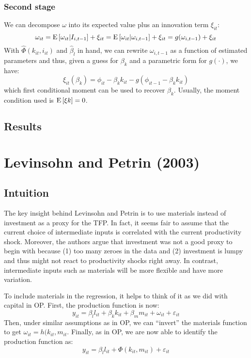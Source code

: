 \subsubsection{Second stage}

We can decompose $\omega$ into its expected value plus an innovation term $\xi_{it}$: $$\omega_{it} = \operatorname{E}\left[\omega_{it}|I_{i,t-1}\right] + \xi_{it} =  \operatorname{E}\left[\omega_{it}|\omega_{i,t-1}\right] + \xi_{it} = g(\omega_{i,t-1}) + \xi_{it} $$ With $\hat\Phi(k_{it}, i_{it})$ and $\hat\beta_l$ in hand, we can rewrite $\omega_{i,t-1}$ as a function of estimated parameters and thus, given a guess for $\beta_k$ and a parametric form for $g(\cdot)$, we have: $$ \xi_{it}(\beta_k) = \phi_{it} - \beta_k k_{it} - g(\phi_{it-1} - \beta_k k_{it}) $$ which first conditional moment can be used to recover $\beta_k$. Usually, the moment condition used is $\operatorname{E}\left[\xi k\right] = 0$. 

\subsection{Results}



\section{Levinsohn and Petrin (2003)}

\subsection{Intuition}

The key insight behind Levinsohn and Petrin is to use materials instead of investment as a proxy for the TFP. In fact, it seems fair to assume that the current choice of intermediate inputs is correlated with the current productivity shock. Moreover, the authors argue that investment was not a good proxy to begin with because (1) too many zeroes in the data and (2) investment is lumpy and thus might not react to productivity shocks right away. In contrast, intermediate inputs such as materials will be more flexible and have more variation.

To include materials in the regression, it helps to think of it as we did with capital in OP. First, the production function is now: $$y_{it} = \beta_l l_{it} +  \beta_k k_{it} + \beta_{m} m_{it} + \omega_{it} + \varepsilon_{it} $$ Then, under similar assumptions as in OP, we can ``invert'' the materials function to get $\omega_{it} = h(k_{it}, m_{it}$. Finally, as in OP, we are now able to identify the production function as: $$y_{it} = \beta_l l_{it} +  \Phi(k_{it}, m_{it}) + \varepsilon_{it} $$

